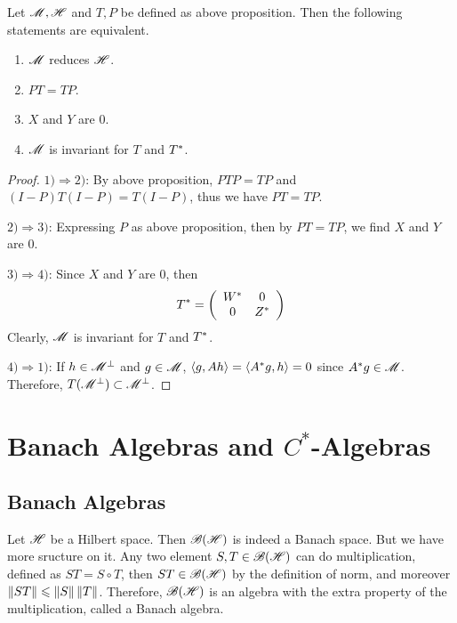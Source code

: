 \documentclass[a4paper,11pt]{report}
\begin{document}
\begin{prop}
	Let $\mathscr{M},\mathscr{H}$ and $T,P$ be defined as above proposition. Then the following statements are equivalent.
	\begin{enumerate}[label=\arabic*)]
		\item $\mathscr{M}$ reduces $\mathscr{H}$.
		\item $PT=TP$.
		\item $X$ and $Y$ are $0$.
		\item $\mathscr{M}$ is invariant for $T$ and $T^{*}$.
	\end{enumerate}
\end{prop}
\begin{proof}
	$1) \Rightarrow 2)$: By above proposition, $PTP=TP$ and $(I-P)T(I-P)=T(I-P)$, thus we have $PT=TP$.
	\item $2) \Rightarrow 3)$: Expressing $P$ as above proposition, then by $PT=TP$, we find $X$ and $Y$ are $0$.
	\item $3) \Rightarrow 4)$: Since $X$ and $Y$ are $0$, then
	\begin{equation*}
		T^{*} = \left(
			\begin{array}{cc}
				W^{*} & 0 \\
				0 & Z^{*}
			\end{array}
		\right)
	\end{equation*}
	Clearly, $\mathscr{M}$ is invariant for $T$ and $T^{*}$.
	\item $4) \Rightarrow 1)$: If $h \in \mathscr{M}^{\bot}$ and $g \in \mathscr{M}$, $\langle g,Ah \rangle = \langle A^{*}g,h \rangle = 0$ since $A^{*}g \in \mathscr{M}$. Therefore, $T(\mathscr{M}^{\bot}) \subset \mathscr{M}^{\bot}$.
\end{proof}

\chapter{Banach Algebras and \texorpdfstring{$C^{*}$-Algebras}{C*-Algebras}}
\section{Banach Algebras}

Let $\mathscr{H}$ be a Hilbert space. Then $\mathscr{B(H)}$ is indeed a Banach space. But we have more sructure on it. Any two element $S,T \in \mathscr{B(H)}$ can do multiplication, defined as $ST = S \circ T$, then $ST \in \mathscr{B(H)}$ by the definition of norm, and moreover $\left\lVert ST\right\lVert \leqslant \left\lVert S\right\lVert\left\lVert T\right\lVert$. Therefore, $\mathscr{B(H)}$ is an algebra with the extra property of the multiplication, called a Banach algebra.
\end{document}
